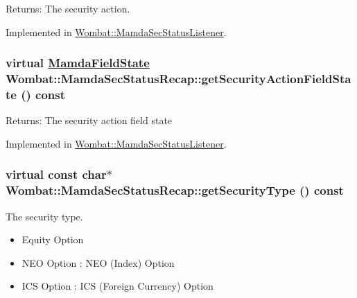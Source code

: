 \begin{Desc}
\item[Returns:]The security action. \end{Desc}


Implemented in \hyperlink{classWombat_1_1MamdaSecStatusListener_a0180f033edd189426cb0c7386f9fb4b}{Wombat::Mamda\-Sec\-Status\-Listener}.\hypertarget{classWombat_1_1MamdaSecStatusRecap_2b3b1757e4d654f75e81bbfc98db9bde}{
\subsubsection[getSecurityActionFieldState]{\setlength{\rightskip}{0pt plus 5cm}virtual \hyperlink{namespaceWombat_93aac974f2ab713554fd12a1fa3b7d2a}{Mamda\-Field\-State} Wombat::Mamda\-Sec\-Status\-Recap::get\-Security\-Action\-Field\-State () const}}
\label{classWombat_1_1MamdaSecStatusRecap_2b3b1757e4d654f75e81bbfc98db9bde}


\begin{Desc}
\item[Returns:]The security action field state \end{Desc}


Implemented in \hyperlink{classWombat_1_1MamdaSecStatusListener_3a220f61dbc73b122840f7f3986d2b9c}{Wombat::Mamda\-Sec\-Status\-Listener}.\hypertarget{classWombat_1_1MamdaSecStatusRecap_2596c31a5b174f0e2fd41a1c7cc7b32f}{
\subsubsection[getSecurityType]{\setlength{\rightskip}{0pt plus 5cm}virtual const char$\ast$ Wombat::Mamda\-Sec\-Status\-Recap::get\-Security\-Type () const}}
\label{classWombat_1_1MamdaSecStatusRecap_2596c31a5b174f0e2fd41a1c7cc7b32f}


The security type. 

\begin{itemize}
\item Equity Option \item NEO Option : NEO (Index) Option \item ICS Option : ICS (Foreign Currency) Option \end{itemize}



